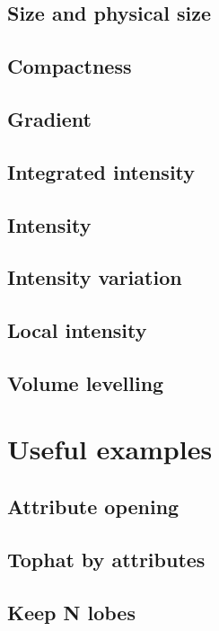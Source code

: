 \documentclass{InsightArticle}
\begin{document}
  \subsection{Size and physical size}

  \subsection{Compactness}

  \subsection{Gradient}

  \subsection{Integrated intensity}

  \subsection{Intensity}

  \subsection{Intensity variation}

  \subsection{Local intensity}

  \subsection{Volume levelling}

\section{Useful examples}

  \subsection{Attribute opening}

  \subsection{Tophat by attributes}

  \subsection{Keep N lobes}
\end{document}
